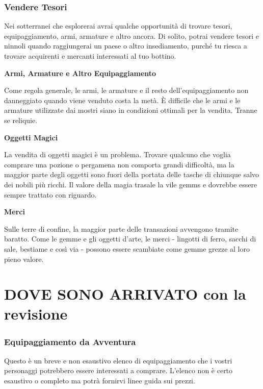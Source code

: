 \documentclass[12pt,a4paper,twoside,openany]{book}
\begin{document}
\begin{multicols}{2}

\subsubsection{Vendere Tesori}

Nei sotterranei che esplorerai avrai qualche opportunità di trovare tesori, equipaggiamento, armi, armature e altro ancora. Di solito, potrai vendere tesori e ninnoli quando raggiungerai un paese o altro insediamento, purché tu riesca a trovare acquirenti e mercanti interessati al tuo bottino.

\medskip

\textbf{Armi, Armature e Altro Equipaggiamento }

Come regola generale, le armi, le armature e il resto dell’equipaggiamento non danneggiato quando viene venduto costa la metà. È difficile che le armi e le armature utilizzate dai mostri siano in condizioni ottimali per la vendita. Tranne se reliquie.

\medskip

\textbf{Oggetti Magici}

La vendita di oggetti magici è un problema. Trovare qualcuno che voglia comprare una pozione o pergamena non comporta grandi difficoltà, ma la maggior parte degli oggetti sono fuori della portata delle tasche di chiunque salvo dei nobili più ricchi. Il valore della magia trasale la vile gemms e dovrebbe essere sempre trattato con riguardo.

\medskip

\textbf{Merci}

Sulle terre di confine, la maggior parte delle transazioni avvengono tramite baratto. Come le gemme e gli oggetti d’arte, le merci - lingotti di ferro, sacchi di sale, bestiame e così via - possono essere scambiate come gemme grezze al loro pieno valore.


\section{DOVE SONO ARRIVATO con la revisione}


\subsubsection{Equipaggiamento da Avventura}

Questo è un breve e non esaustivo elenco di equipaggiamento che i vostri personaggi potrebbero essere interessati a comprare. L'elenco non è certo esaustivo o completo ma potrà fornirvi linee guida sui prezzi.


\end{multicols}
\end{document}
